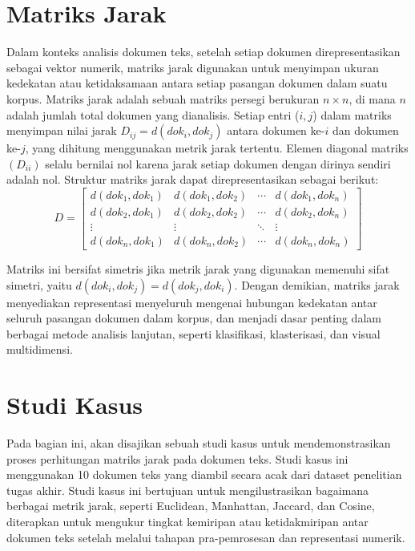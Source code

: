 \documentclass[a4paper,12pt]{report}
\numberwithin{equation}{chapter}
\begin{document}
\section{Matriks Jarak}
Dalam konteks analisis dokumen teks, setelah setiap dokumen direpresentasikan sebagai vektor numerik, matriks jarak digunakan untuk menyimpan ukuran kedekatan atau ketidaksamaan antara setiap pasangan dokumen dalam suatu korpus. Matriks jarak adalah sebuah matriks persegi berukuran $n \times n$, di mana $n$ adalah jumlah total dokumen yang dianalisis. Setiap entri ($i,j$) dalam matriks menyimpan nilai jarak $D_{ij}=d(dok_i,dok_j)$ antara dokumen ke-$i$ dan dokumen ke-$j$, yang dihitung menggunakan metrik jarak tertentu. Elemen diagonal matriks $(D_{ii})$ selalu bernilai nol karena jarak setiap dokumen dengan dirinya sendiri adalah nol. Struktur matriks jarak dapat direpresentasikan sebagai berikut:
\[
D = 
\begin{bmatrix}
d(dok_1, dok_1) & d(dok_1, dok_2) & \cdots & d(dok_1, dok_n) \\
d(dok_2, dok_1) & d(dok_2, dok_2) & \cdots & d(dok_2, dok_n) \\
\vdots & \vdots & \ddots & \vdots \\
d(dok_n, dok_1) & d(dok_n, dok_2) & \cdots & d(dok_n, dok_n)
\end{bmatrix}
\]

Matriks ini bersifat simetris jika metrik jarak yang digunakan memenuhi sifat simetri, yaitu $d(dok_i,dok_j)=d(dok_j,dok_i)$. Dengan demikian, matriks jarak menyediakan representasi menyeluruh mengenai hubungan kedekatan antar seluruh pasangan dokumen dalam korpus, dan menjadi dasar penting dalam berbagai metode analisis lanjutan, seperti klasifikasi, klasterisasi, dan visual multidimensi.

\section{Studi Kasus}
Pada bagian ini, akan disajikan sebuah studi kasus untuk mendemonstrasikan proses perhitungan matriks jarak pada dokumen teks. Studi kasus ini menggunakan 10 dokumen teks yang diambil secara acak dari dataset penelitian tugas akhir. Studi kasus ini bertujuan untuk mengilustrasikan bagaimana berbagai metrik jarak, seperti Euclidean, Manhattan, Jaccard, dan Cosine, diterapkan untuk mengukur tingkat kemiripan atau ketidakmiripan antar dokumen teks setelah melalui tahapan pra-pemrosesan dan representasi numerik.
\end{document}
